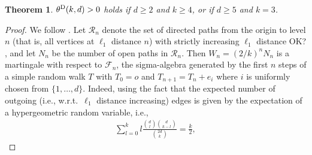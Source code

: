 \documentclass{article}
\newtheorem{theorem}{Theorem}[section]
\theoremstyle{definition}
\newcommand{\1}{\mathbbm{1}}
\newcommand{\0}{\mathbf{o}}
\begin{document}
\begin{theorem}\label{thm-CoxDurrett}
$\theta^{\rm D}(k,d)>0$ holds if $d \geq 2$ and $k \geq 4$, or if $d \geq 5$ and $k=3$. 
\end{theorem}
\begin{proof}
We follow \cite[Section 2]{CoxDurrett}. Let $\mathcal R_n$ denote the set of directed paths from the origin to level $n$ (that is, all vertices at $\ell_1$ distance $n$) with strictly increasing $\ell_1$ distance \color{red} OK? \color{black}, and let $N_n$ be the number of open paths in $\mathcal R_n$. Then $W_n=(2/k)^nN_n$ is a martingale with respect to $\mathcal F_n$, the sigma-algebra generated by the first $n$ steps of a simple random walk $T$ with $T_0=o$ and $T_{n+1}=T_n+e_i$ where $i$ is uniformly chosen from $\{1,\dots ,d\}$. Indeed, using the fact that the expected number of outgoing (i.e., w.r.t.\ $\ell_1$ distance increasing) edges  is given by the expectation of a hypergeometric random variable, i.e., 
\begin{align*}
\sum_{l=0}^k l\frac{\binom{d}{l}\binom{d}{k-l}}{\binom{2d}{k}}=\frac{k}{2},
\end{align*}


\end{proof}
\end{document}
